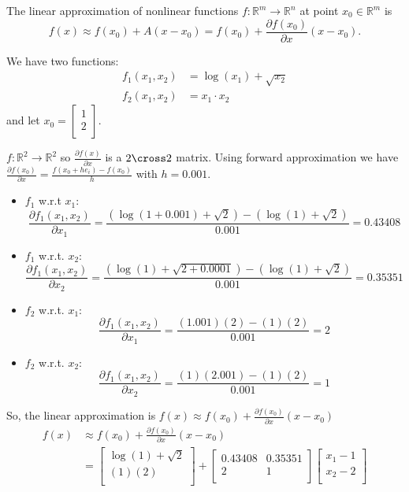 The linear approximation of nonlinear functions \(f: \mathbb{R}^m \to \mathbb{R}^n\) at point \(x_0 \in \mathbb{R}^m\) is
\[
  f(x) \approx f(x_0) + A(x - x_0) = f(x_0) + \frac{\partial f(x_0)}{\partial x} (x - x_0).
\]

\begin{problem}
  We have two functions:
  \begin{align*}
    f_1(x_1, x_2) &= \log (x_1) + \sqrt{x_2} \\
    f_2(x_1, x_2) &= x_1 \cdot x_2
  \end{align*}
  and let \(x_0 =
  \begin{bmatrix}
    1 \\
    2 \\  
  \end{bmatrix}\). 
\end{problem}
\begin{answer}
  \(f: \mathbb{R}^2 \to \mathbb{R}^2\) so \(\frac{\partial f(x)}{\partial x} \) is a \(2 \cross 2\) matrix. Using forward approximation we have \(\frac{\partial f(x_0)}{\partial x} = \frac{f(x_0 + he_i) - f(x_0)}{h} \) with \(h = 0.001\).
  \begin{itemize}
    \item \(f_1\) w.r.t \(x_1\):
    \[
      \frac{\partial f_1(x_1,x_2)}{\partial x_1} =
      \frac{(\log (1 + 0.001) + \sqrt{2}) - (\log (1) + \sqrt{2})}{0.001} =
      0.43408
    \]
    \item \(f_1\) w.r.t. \(x_2\):
    \[
      \frac{\partial f_1(x_1,x_2)}{\partial x_2} =
      \frac{(\log (1) + \sqrt{2 + 0.0001}) - (\log (1) + \sqrt{2})}{0.001} =
      0.35351
    \]
    \item \(f_2\) w.r.t. \(x_1\):
    \[
      \frac{\partial f_1(x_1,x_2)}{\partial x_1} =
      \frac{(1.001)(2) - (1)(2)}{0.001} = 2
    \]
    \item \(f_2\) w.r.t. \(x_2\):
    \[
      \frac{\partial f_1(x_1,x_2)}{\partial x_2} =
      \frac{(1)(2.001) - (1)(2)}{0.001} = 1
    \]
  \end{itemize}
  So, the linear approximation is \(f(x) \approx f(x_0) + \frac{\partial f(x_0)}{\partial x} (x - x_0)\)
  \begin{align*}
    f(x) &\approx f(x_0) + \frac{\partial f(x_0)}{\partial x}(x-x_0) \\
    &=
    \begin{bmatrix}
      \log (1) + \sqrt{2} \\
      (1)(2) \\
    \end{bmatrix} + \left[
    \begin{array}{cc}
      0.43408 & 0.35351 \\
      2 & 1 \\
    \end{array} \right]
    \begin{bmatrix}
      x_1 - 1 \\
      x_2 - 2 \\
    \end{bmatrix}
  \end{align*}
\end{answer}

